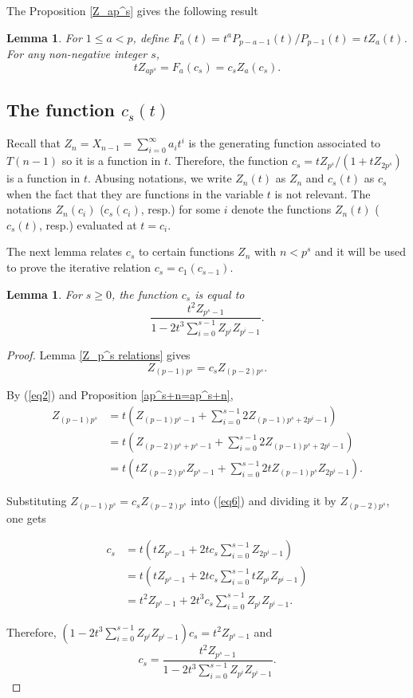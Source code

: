 \documentclass[11 pt]{amsart}
\theoremstyle{plain}
\newtheorem{lemma}[thm]{Lemma}
\theoremstyle{definition}
\theoremstyle{remark}
\begin{document}
The Proposition \ref{Z_ap^s} gives the following result
\begin{lemma}\label{functionF}
    For $1 \le a <p$, define $F_a(t)=t^aP_{p-a-1}(t)/P_{p-1}(t)= tZ_a(t)$. For any non-negative integer $s$, $$tZ_{ap^s}=F_a(c_s)=c_s Z_a(c_s).$$
\end{lemma}

\subsection{The function $c_s(t)$}

Recall that $Z_n=X_{n-1}=\sum_{i=0}^\infty a_i t^i$ is the generating function associated to $T(n-1)$ so it is a function in $t$. Therefore, the function $c_s=tZ_{p^s}/(1+tZ_{2p^s}) $ is a function in $t$. Abusing notations, we write $Z_n(t)$ as $Z_n$ and $c_s(t)$ as $c_s$ when the fact that they are functions in the variable $t$ is not relevant. The notations $Z_n(c_i)$ ($c_s(c_i)$, resp.) for some $i$ denote the functions $Z_n(t)$ ($c_s(t)$, resp.) evaluated at $t=c_i$.

The next lemma relates $c_s$ to certain functions $Z_n$
with $n<p^s$ and it will be used to prove the iterative relation $c_s=c_1(c_{s-1})$.

\begin{lemma} \label{expression of c_s}
    For $s\ge 0$, the function $c_s$ is equal to $$\frac{t^2Z_{p^s-1}}{1-2t^3\sum_{i=0}^{s-1}Z_{p^i}Z_{p^i-1}}.$$ 
\end{lemma}

\begin{proof}
    Lemma \ref{Z_p^s relations} gives \begin{equation*}
    Z_{(p-1)p^s}=c_sZ_{(p-2)p^s}.
\end{equation*}

By (\ref{eq2}) and Proposition \ref{ap^s+n=ap^s+n}, 
    \begin{align} \label{eq6}
\nonumber        
        Z_{(p-1)p^s}&=t(Z_{(p-1)p^s-1}+ \sum_{i=0}^{s-1} 2Z_{(p-1)p^s+2p^i-1})\\ 
\nonumber
        &=t(Z_{(p-2)p^s+p^s-1}+ \sum_{i=0}^{s-1} 2Z_{(p-1)p^s+2p^i-1})\\
        &=t(tZ_{(p-2)p^s}Z_{p^s-1}+ \sum_{i=0}^{s-1} 2tZ_{(p-1)p^s}Z_{2p^i-1}).
    \end{align}



Substituting $ Z_{(p-1)p^s}=c_sZ_{(p-2)p^s}$ into (\ref{eq6}) and dividing it by $ Z_{(p-2)p^s}$, one gets

\begin{align*}
    c_s&=t(tZ_{p^s-1}+2tc_s \sum_{i=0}^{s-1}Z_{2p^i-1})\\
    &=t(tZ_{p^s-1}+2tc_s \sum_{i=0}^{s-1}tZ_{p^i}Z_{p^i-1})\\
    &=t^2Z_{p^s-1}+2t^3c_s\sum_{i=0}^{s-1}Z_{p^i}Z_{p^i-1}.
\end{align*}

Therefore, $(1-2t^3\sum_{i=0}^{s-1}Z_{p^i}Z_{p^i-1})c_s=t^2Z_{p^s-1}$ and \begin{equation*}
    c_s=\frac{t^2Z_{p^s-1}}{1-2t^3\sum_{i=0}^{s-1}Z_{p^i}Z_{p^i-1}}.     
\end{equation*}
\end{proof}
\end{document}
